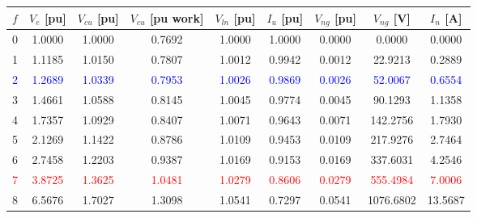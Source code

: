 \begin{tabular}{ccccccccc}
\toprule
$f$ & $V_e$ [pu] & $V_{cu}$ [pu] & $V_{cu}$ [pu work] & $V_{ln}$ [pu] & $I_u$ [pu] & $V_{ng}$ [pu] & $V_{ng}$ [V] & $I_n$ [A] \\
\midrule
0 & 1.0000 & 1.0000 & 0.7692 & 1.0000 & 1.0000 & 0.0000 & 0.0000 & 0.0000 \\
1 & 1.1185 & 1.0150 & 0.7807 & 1.0012 & 0.9942 & 0.0012 & 22.9213 & 0.2889 \\
\textcolor{blue}{2} & \textcolor{blue}{1.2689} & \textcolor{blue}{1.0339} & \textcolor{blue}{0.7953} & \textcolor{blue}{1.0026} & \textcolor{blue}{0.9869} & \textcolor{blue}{0.0026} & \textcolor{blue}{52.0067} & \textcolor{blue}{0.6554} \\
3 & 1.4661 & 1.0588 & 0.8145 & 1.0045 & 0.9774 & 0.0045 & 90.1293 & 1.1358 \\
\textcolor{yellow!50!black}{4} & \textcolor{yellow!50!black}{1.7357} & \textcolor{yellow!50!black}{1.0929} & \textcolor{yellow!50!black}{0.8407} & \textcolor{yellow!50!black}{1.0071} & \textcolor{yellow!50!black}{0.9643} & \textcolor{yellow!50!black}{0.0071} & \textcolor{yellow!50!black}{142.2756} & \textcolor{yellow!50!black}{1.7930} \\
5 & 2.1269 & 1.1422 & 0.8786 & 1.0109 & 0.9453 & 0.0109 & 217.9276 & 2.7464 \\
6 & 2.7458 & 1.2203 & 0.9387 & 1.0169 & 0.9153 & 0.0169 & 337.6031 & 4.2546 \\
\textcolor{red}{7} & \textcolor{red}{3.8725} & \textcolor{red}{1.3625} & \textcolor{red}{1.0481} & \textcolor{red}{1.0279} & \textcolor{red}{0.8606} & \textcolor{red}{0.0279} & \textcolor{red}{555.4984} & \textcolor{red}{7.0006} \\
8 & 6.5676 & 1.7027 & 1.3098 & 1.0541 & 0.7297 & 0.0541 & 1076.6802 & 13.5687 \\
\bottomrule
\end{tabular}